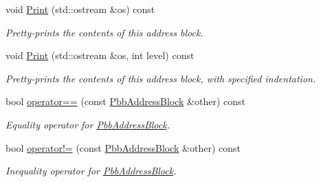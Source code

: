 \begin{DoxyCompactItemize}
void \hyperlink{classns3_1_1PbbAddressBlock_a386888d0e8e25d9dc6e29afd16195c0a}{Print} (std\+::ostream \&os) const 
\begin{DoxyCompactList}\small\item\em Pretty-\/prints the contents of this address block. \end{DoxyCompactList}\item 
void \hyperlink{classns3_1_1PbbAddressBlock_a9db26b69a52f139c1e5248830f006040}{Print} (std\+::ostream \&os, int level) const 
\begin{DoxyCompactList}\small\item\em Pretty-\/prints the contents of this address block, with specified indentation. \end{DoxyCompactList}\item 
bool \hyperlink{classns3_1_1PbbAddressBlock_aec96efe4a1ad8dac29c776fa5aeaebbf}{operator==} (const \hyperlink{classns3_1_1PbbAddressBlock}{Pbb\+Address\+Block} \&other) const 
\begin{DoxyCompactList}\small\item\em Equality operator for \hyperlink{classns3_1_1PbbAddressBlock}{Pbb\+Address\+Block}. \end{DoxyCompactList}\item 
bool \hyperlink{classns3_1_1PbbAddressBlock_afcbdbe316e627873c5663769e233ddf6}{operator!=} (const \hyperlink{classns3_1_1PbbAddressBlock}{Pbb\+Address\+Block} \&other) const 
\begin{DoxyCompactList}\small\item\em Inequality operator for \hyperlink{classns3_1_1PbbAddressBlock}{Pbb\+Address\+Block}. \end{DoxyCompactList}\end{DoxyCompactItemize}
